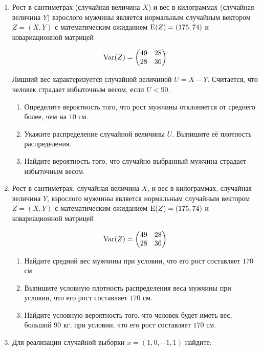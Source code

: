 \begin{enumerate}
\item Рост в сантиметрах (случайная величина $X$) и вес в килограммах
(случайная величина $Y$) взрослого мужчины является нормальным
случайным вектором $Z = (X, Y)$ с математическим ожиданием $\operatorname{E}(Z) = (175, 74)$
и ковариационной матрицей

\[
\operatorname{Var}(Z) =
\begin{pmatrix}
 49 & 28 \\
28 & 36
\end{pmatrix}
\]

Лишний вес характеризуется случайной величиной $U = X - Y$.
Считается, что человек страдает избыточным весом, если $U < 90$.

\begin{enumerate}
\item Определите вероятность того, что рост мужчины отклоняется от среднего более, чем на $10$ см.
\item Укажите распределение случайной величины $U$. Выпишите её плотность распределения.
\item Найдите вероятность того, что случайно выбранный мужчина страдает избыточным весом.
\end{enumerate}

\item Рост в сантиметрах, случайная величина $X$, и вес в килограммах,
случайная величина $Y$, взрослого мужчины является нормальным случайным вектором
$Z = (X, Y)$ с математическим ожиданием $\operatorname{E}(Z) = (175, 74)$ и ковариационной матрицей

\[
\operatorname{Var}(Z) =
\begin{pmatrix}
 49 & 28 \\
28 & 36
\end{pmatrix}
\]

\begin{enumerate}
\item Найдите средний вес мужчины при условии, что его рост составляет $170$ см.
\item Выпишите условную плотность распределения веса мужчины при условии, что его рост составляет $170$ см.
\item Найдите условную вероятность того, что человек будет иметь вес, больший $90$ кг, при условии, что его рост составляет $170$ см.
\end{enumerate}

\item Для реализации случайной выборки $x=(1,0,-1,1)$ найдите:


\end{enumerate}
